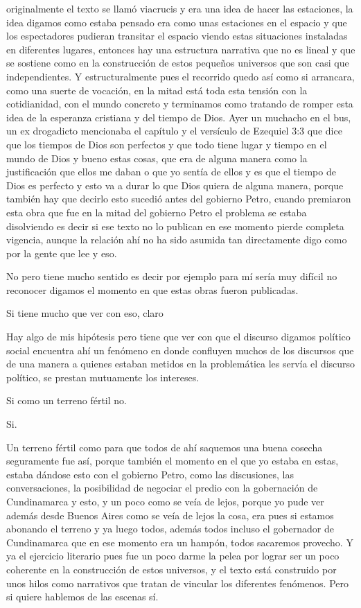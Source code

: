 originalmente el texto se llamó viacrucis y era una idea de hacer las estaciones, la idea digamos como estaba pensado era como unas estaciones en el espacio y que los espectadores pudieran transitar el espacio viendo estas situaciones instaladas en diferentes lugares, entonces hay una estructura narrativa que no es lineal y que se sostiene como en la construcción de estos pequeños universos que son casi que independientes. Y estructuralmente pues el recorrido quedo así como si arrancara, como una suerte de vocación, en la mitad está toda esta tensión con la cotidianidad, con el mundo concreto y terminamos como tratando de romper esta idea de la esperanza cristiana y del tiempo de Dios.
Ayer un muchacho en el bus, un ex drogadicto mencionaba el capítulo y el versículo de Ezequiel 3:3 que dice que los tiempos de Dios son perfectos y que todo tiene lugar y tiempo en el mundo de Dios y bueno estas cosas, que era de alguna manera como la justificación que ellos me daban o que yo sentía de ellos y es que el tiempo de Dios es perfecto y esto va a durar lo que Dios quiera de alguna manera, porque también hay que decirlo esto sucedió antes del gobierno Petro, cuando premiaron esta obra que fue en la mitad del gobierno Petro el problema se estaba disolviendo es decir si ese texto no lo publican en ese momento pierde completa vigencia, aunque la relación ahí no ha sido asumida tan directamente digo como por la gente que lee y eso.

No pero tiene mucho sentido es decir por ejemplo para mí sería muy difícil no reconocer digamos el momento en que estas obras fueron publicadas.

Si tiene mucho que ver con eso, claro

Hay algo de mis hipótesis pero tiene que ver con que el discurso digamos político social encuentra ahí un fenómeno en donde confluyen muchos de los discursos que de una manera a quienes estaban metidos en la problemática les servía el discurso político, se prestan mutuamente los intereses.

Si como un terreno fértil no.

Si.

Un terreno fértil como para que todos de ahí saquemos una buena cosecha seguramente fue así, porque también el momento en el que yo estaba en estas, estaba dándose esto con el gobierno Petro, como las discusiones, las conversaciones, la posibilidad de negociar el predio con la gobernación de Cundinamarca y esto, y un poco como se veía de lejos, porque yo pude ver además desde Buenos Aires como se veía de lejos la cosa, era pues si estamos abonando el terreno y ya luego todos, además todos incluso el gobernador de Cundinamarca que en ese momento era un hampón, todos sacaremos provecho.
Y ya el ejercicio literario pues fue un poco darme la pelea por lograr ser un poco coherente en la construcción de estos universos, y el texto está construido por unos hilos como narrativos que tratan de vincular los diferentes fenómenos. Pero si quiere hablemos de las escenas sí.

